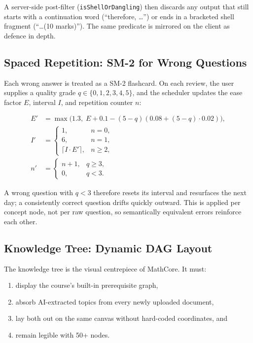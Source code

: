 \documentclass[11pt,a4paper]{article}
\newcommand{\code}[1]{\texttt{\small #1}}
\begin{document}
A server-side post-filter (\code{isShellOrDangling}) then discards any output that still starts with a continuation word (``therefore, \ldots'') or ends in a bracketed shell fragment (``\ldots (10 marks)''). The same predicate is mirrored on the client as defence in depth.

\subsection{Spaced Repetition: SM-2 for Wrong Questions}

Each wrong answer is treated as a SM-2 flashcard. On each review, the user supplies a quality grade $q \in \{0,1,2,3,4,5\}$, and the scheduler updates the ease factor $E$, interval $I$, and repetition counter $n$:

\begin{align*}
E' &= \max\bigl(1.3,\; E + 0.1 - (5-q)(0.08 + (5-q)\cdot 0.02)\bigr),\\[2pt]
I' &=
\begin{cases}
1, & n = 0,\\
6, & n = 1,\\
\lceil I \cdot E' \rceil, & n \geq 2,
\end{cases}\\[2pt]
n' &= \begin{cases} n+1, & q \geq 3,\\ 0, & q < 3.\end{cases}
\end{align*}

A wrong question with $q < 3$ therefore resets its interval and resurfaces the next day; a consistently correct question drifts quickly outward. This is applied per concept node, not per raw question, so semantically equivalent errors reinforce each other.

\subsection{Knowledge Tree: Dynamic DAG Layout}
\label{sec:tree}

The knowledge tree is the visual centrepiece of MathCore. It must:

\begin{enumerate}[leftmargin=*,label=(\alph*)]
    \item display the course's built-in prerequisite graph,
    \item absorb AI-extracted topics from every newly uploaded document,
    \item lay both out on the same canvas without hard-coded coordinates, and
    \item remain legible with 50+ nodes.
\end{enumerate}
\end{document}
